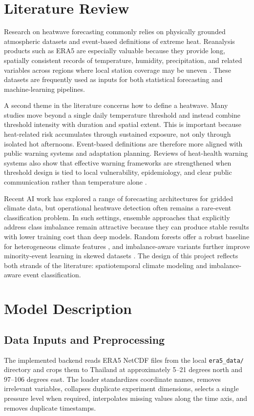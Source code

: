 \documentclass[12pt,a4paper]{article}
\begin{document}
\section{Literature Review}
Research on heatwave forecasting commonly relies on physically grounded atmospheric datasets and event-based definitions of extreme heat. Reanalysis products such as ERA5 are especially valuable because they provide long, spatially consistent records of temperature, humidity, precipitation, and related variables across regions where local station coverage may be uneven \cite{hersbach2020}. These datasets are frequently used as inputs for both statistical forecasting and machine-learning pipelines.

A second theme in the literature concerns how to define a heatwave. Many studies move beyond a single daily temperature threshold and instead combine threshold intensity with duration and spatial extent. This is important because heat-related risk accumulates through sustained exposure, not only through isolated hot afternoons. Event-based definitions are therefore more aligned with public warning systems and adaptation planning. Reviews of heat-health warning systems also show that effective warning frameworks are strengthened when threshold design is tied to local vulnerability, epidemiology, and clear public communication rather than temperature alone \cite{chandra2025,toloo2013}.

Recent AI work has explored a range of forecasting architectures for gridded climate data, but operational heatwave detection often remains a rare-event classification problem. In such settings, ensemble approaches that explicitly address class imbalance remain attractive because they can produce stable results with lower training cost than deep models. Random forests offer a robust baseline for heterogeneous climate features \cite{breiman2001}, and imbalance-aware variants further improve minority-event learning in skewed datasets \cite{chen2004}. The design of this project reflects both strands of the literature: spatiotemporal climate modeling and imbalance-aware event classification.

\section{Model Description}
\subsection{Data Inputs and Preprocessing}
The implemented backend reads ERA5 NetCDF files from the local \texttt{era5\_data/} directory and crops them to Thailand at approximately 5--21 degrees north and 97--106 degrees east. The loader standardizes coordinate names, removes irrelevant variables, collapses duplicate experiment dimensions, selects a single pressure level when required, interpolates missing values along the time axis, and removes duplicate timestamps.
\end{document}
